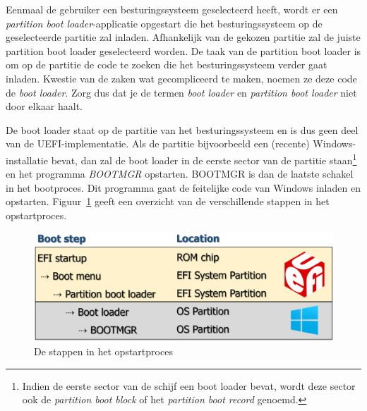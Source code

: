 Eenmaal de gebruiker een besturingssysteem geselecteerd heeft, wordt er een \emph{partition boot loader}-applicatie opgestart die het besturingssysteem op de geselecteerde partitie zal inladen. Afhankelijk van de gekozen
partitie zal de juiste partition boot loader geselecteerd worden. De taak van de partition boot loader is om op de partitie
de code te zoeken die het besturingssysteem verder gaat inladen. Kwestie van de zaken wat gecompliceerd te maken, noemen ze deze code
de \emph{boot loader}. Zorg dus dat je de termen \emph{boot loader} en \emph{partition boot loader} niet door elkaar
haalt.

De boot loader staat op de partitie van het besturingssysteem en is dus geen deel van de UEFI-implementatie. Als de partitie
bijvoorbeeld een (recente) Windows-installatie bevat, dan zal de boot loader in de eerste sector van de partitie staan\footnote{Indien de eerste sector van de schijf een boot loader bevat, wordt deze sector ook de \emph{partition boot block} of het \emph{partition boot record} genoemd.} en het
programma \emph{BOOTMGR} opstarten. BOOTMGR is dan de laatste schakel in het bootproces. Dit programma gaat de feitelijke code van Windows inladen en opstarten. Figuur~\ref{bootsteps} geeft een overzicht van de verschillende stappen in het opstartproces.

\begin{figure}
\begin{center}
\includegraphics[width=125mm]{images/startupsteps.png}
\end{center}
\caption{De stappen in het opstartproces}
\label{bootsteps}
\end{figure}

